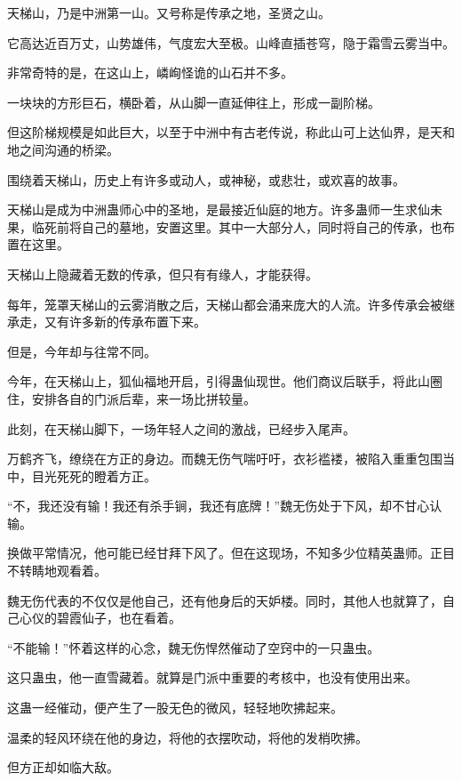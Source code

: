
\begin{this_body}

天梯山，乃是中洲第一山。又号称是传承之地，圣贤之山。

它高达近百万丈，山势雄伟，气度宏大至极。山峰直插苍穹，隐于霜雪云雾当中。

非常奇特的是，在这山上，嶙峋怪诡的山石并不多。

一块块的方形巨石，横卧着，从山脚一直延伸往上，形成一副阶梯。

但这阶梯规模是如此巨大，以至于中洲中有古老传说，称此山可上达仙界，是天和地之间沟通的桥梁。

围绕着天梯山，历史上有许多或动人，或神秘，或悲壮，或欢喜的故事。

天梯山是成为中洲蛊师心中的圣地，是最接近仙庭的地方。许多蛊师一生求仙未果，临死前将自己的墓地，安置这里。其中一大部分人，同时将自己的传承，也布置在这里。

天梯山上隐藏着无数的传承，但只有有缘人，才能获得。

每年，笼罩天梯山的云雾消散之后，天梯山都会涌来庞大的人流。许多传承会被继承走，又有许多新的传承布置下来。

但是，今年却与往常不同。

今年，在天梯山上，狐仙福地开启，引得蛊仙现世。他们商议后联手，将此山圈住，安排各自的门派后辈，来一场比拼较量。

此刻，在天梯山脚下，一场年轻人之间的激战，已经步入尾声。

万鹤齐飞，缭绕在方正的身边。而魏无伤气喘吁吁，衣衫褴褛，被陷入重重包围当中，目光死死的瞪着方正。

“不，我还没有输！我还有杀手锏，我还有底牌！”魏无伤处于下风，却不甘心认输。

换做平常情况，他可能已经甘拜下风了。但在这现场，不知多少位精英蛊师。正目不转睛地观看着。

魏无伤代表的不仅仅是他自己，还有他身后的天妒楼。同时，其他人也就算了，自己心仪的碧霞仙子，也在看着。

“不能输！”怀着这样的心念，魏无伤悍然催动了空窍中的一只蛊虫。

这只蛊虫，他一直雪藏着。就算是门派中重要的考核中，也没有使用出来。

这蛊一经催动，便产生了一股无色的微风，轻轻地吹拂起来。

温柔的轻风环绕在他的身边，将他的衣摆吹动，将他的发梢吹拂。

但方正却如临大敌。


\end{this_body}
